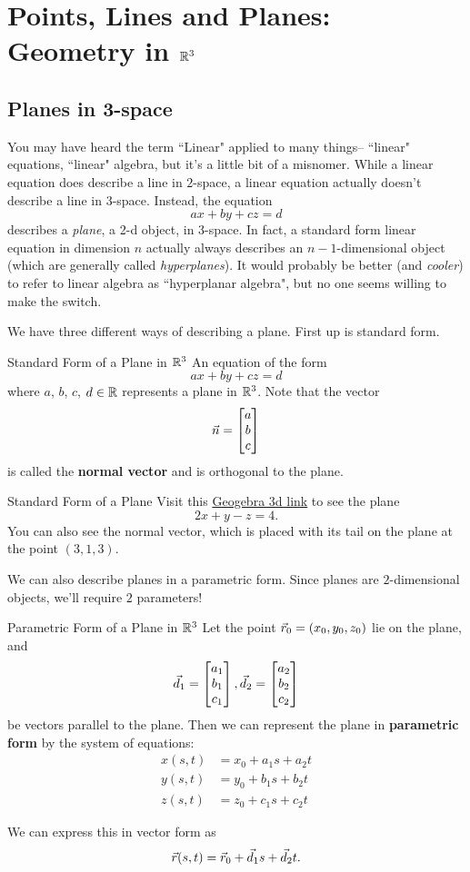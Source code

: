 \section{Points, Lines and Planes: Geometry in $\mathbb{R}^3$}
\subsection{Planes in 3-space}
You may have heard the term ``Linear" applied to many things-- ``linear" equations, ``linear" algebra, but it's a little bit of a misnomer. While a linear equation does describe a line in $2$-space, a linear equation actually doesn't describe a line in $3$-space. Instead, the equation $$ax+by+cz=d $$ describes a \textit{plane}, a 2-d object, in 3-space. In fact, a standard form linear equation in dimension $n$ actually always describes an $n-1$-dimensional object (which are generally called \textit{hyperplanes}). It would probably be better (and \textit{cooler}) to refer to linear algebra as ``hyperplanar algebra", but no one seems willing to make the switch.

We have three different ways of describing a plane. First up is standard form.

\begin{definition}{Standard Form of a Plane in $\mathbb{R}^3$}
An equation of the form $$ax+by+cz=d$$ where $a$, $b$, $c$, $d\in\mathbb{R}$ represents a plane in $\mathbb{R}^3$. Note that the vector $$\vec{n}=\begin{bmatrix}a\\b\\c\end{bmatrix}$$ is called the \textbf{normal vector} and is orthogonal to the plane.
\end{definition}

\begin{example}{Standard Form of a Plane}
Visit this \href{https://www.geogebra.org/3d/t4qxhucj}{Geogebra 3d link} to see the plane $$2x+y-z=4.$$ You can also see the normal vector, which is placed with its tail on the plane at the point $(3,1,3)$.
\end{example}

We can also describe planes in a parametric form. Since planes are $2$-dimensional objects, we'll require $2$ parameters!

\begin{definition}{\hypertarget{paraplane}{Parametric Form of a Plane in $\mathbb{R}^3$}}
Let the point $\vec{r}_0=(x_0, y_0, z_0)$ lie on the plane, and $$\vec{d}_1=\begin{bmatrix}a_1\\b_1\\c_1\end{bmatrix}, \vec{d}_2=\begin{bmatrix}a_2\\b_2\\c_2\end{bmatrix}$$ be vectors parallel to the plane. Then we can represent the plane in \textbf{parametric form} by the system of equations:
\begin{align*}
x(s,t)&=x_0+a_1s+a_2t \\
y(s,t)&=y_0+b_1s+b_2t \\
z(s,t)&=z_0+c_1s+c_2t
\end{align*}

We can express this in vector form as $$\vec{r}(s,t)=\vec{r}_0+\vec{d}_1s+\vec{d}_2t.$$
\end{definition}

